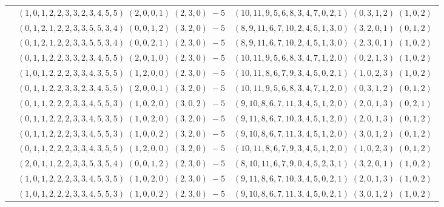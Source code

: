 \documentclass[11pt]{article}
\begin{document}
\begin{longtable}[l]{|c|c|c|}
 \cline{2-3} 
 & $(1 ,0 ,1 ,2 ,2 ,3 ,3 ,2 ,3 ,4 ,5 ,5) \;(2 ,0 ,0 ,1) \;(2 ,3 ,0) \;-5$ & $(10 ,11 ,9 ,5 ,6 ,8 ,3 ,4 ,7 ,0 ,2 ,1) \;(0 ,3 ,1 ,2) \;(1 ,0 ,2) \;$\\ 
 \cline{2-3} 
 & $(0 ,1 ,2 ,1 ,2 ,2 ,3 ,3 ,5 ,5 ,3 ,4) \;(0 ,0 ,1 ,2) \;(3 ,2 ,0) \;-5$ & $(8 ,9 ,11 ,6 ,7 ,10 ,2 ,4 ,5 ,1 ,3 ,0) \;(3 ,2 ,0 ,1) \;(0 ,1 ,2) \;$\\ 
 \cline{2-3} 
 & $(0 ,1 ,2 ,1 ,2 ,2 ,3 ,3 ,5 ,5 ,3 ,4) \;(0 ,0 ,2 ,1) \;(2 ,3 ,0) \;-5$ & $(8 ,9 ,11 ,6 ,7 ,10 ,2 ,4 ,5 ,1 ,3 ,0) \;(2 ,3 ,0 ,1) \;(1 ,0 ,2) \;$\\ 
 \cline{2-3} 
 & $(0 ,1 ,1 ,2 ,2 ,3 ,3 ,2 ,3 ,4 ,5 ,5) \;(2 ,0 ,1 ,0) \;(2 ,3 ,0) \;-5$ & $(10 ,11 ,9 ,5 ,6 ,8 ,3 ,4 ,7 ,1 ,2 ,0) \;(0 ,2 ,1 ,3) \;(1 ,0 ,2) \;$\\ 
 \cline{2-3} 
 & $(1 ,0 ,1 ,2 ,2 ,2 ,3 ,3 ,4 ,3 ,5 ,5) \;(1 ,2 ,0 ,0) \;(2 ,3 ,0) \;-5$ & $(10 ,11 ,8 ,6 ,7 ,9 ,3 ,4 ,5 ,0 ,2 ,1) \;(1 ,0 ,2 ,3) \;(1 ,0 ,2) \;$\\ 
 \cline{2-3} 
 & $(0 ,1 ,1 ,2 ,2 ,3 ,3 ,2 ,3 ,4 ,5 ,5) \;(2 ,0 ,0 ,1) \;(3 ,2 ,0) \;-5$ & $(10 ,11 ,9 ,5 ,6 ,8 ,3 ,4 ,7 ,1 ,2 ,0) \;(0 ,3 ,1 ,2) \;(0 ,1 ,2) \;$\\ 
 \cline{2-3} 
 & $(0 ,1 ,1 ,2 ,2 ,2 ,3 ,3 ,4 ,5 ,5 ,3) \;(1 ,0 ,2 ,0) \;(3 ,0 ,2) \;-5$ & $(9 ,10 ,8 ,6 ,7 ,11 ,3 ,4 ,5 ,1 ,2 ,0) \;(2 ,0 ,1 ,3) \;(0 ,2 ,1) \;$\\ 
 \cline{2-3} 
 & $(0 ,1 ,1 ,2 ,2 ,2 ,3 ,3 ,4 ,5 ,3 ,5) \;(1 ,0 ,2 ,0) \;(3 ,2 ,0) \;-5$ & $(9 ,11 ,8 ,6 ,7 ,10 ,3 ,4 ,5 ,1 ,2 ,0) \;(2 ,0 ,1 ,3) \;(0 ,1 ,2) \;$\\ 
 \cline{2-3} 
 & $(0 ,1 ,1 ,2 ,2 ,2 ,3 ,3 ,4 ,5 ,5 ,3) \;(1 ,0 ,0 ,2) \;(3 ,2 ,0) \;-5$ & $(9 ,10 ,8 ,6 ,7 ,11 ,3 ,4 ,5 ,1 ,2 ,0) \;(3 ,0 ,1 ,2) \;(0 ,1 ,2) \;$\\ 
 \cline{2-3} 
 & $(0 ,1 ,1 ,2 ,2 ,2 ,3 ,3 ,4 ,3 ,5 ,5) \;(1 ,2 ,0 ,0) \;(3 ,2 ,0) \;-5$ & $(10 ,11 ,8 ,6 ,7 ,9 ,3 ,4 ,5 ,1 ,2 ,0) \;(1 ,0 ,2 ,3) \;(0 ,1 ,2) \;$\\ 
 \cline{2-3} 
 & $(2 ,0 ,1 ,1 ,2 ,2 ,3 ,3 ,5 ,3 ,5 ,4) \;(0 ,0 ,1 ,2) \;(2 ,3 ,0) \;-5$ & $(8 ,10 ,11 ,6 ,7 ,9 ,0 ,4 ,5 ,2 ,3 ,1) \;(3 ,2 ,0 ,1) \;(1 ,0 ,2) \;$\\ 
 \cline{2-3} 
 & $(1 ,0 ,1 ,2 ,2 ,2 ,3 ,3 ,4 ,5 ,3 ,5) \;(1 ,0 ,2 ,0) \;(2 ,3 ,0) \;-5$ & $(9 ,11 ,8 ,6 ,7 ,10 ,3 ,4 ,5 ,0 ,2 ,1) \;(2 ,0 ,1 ,3) \;(1 ,0 ,2) \;$\\ 
 \cline{2-3} 
 & $(1 ,0 ,1 ,2 ,2 ,2 ,3 ,3 ,4 ,5 ,5 ,3) \;(1 ,0 ,0 ,2) \;(2 ,3 ,0) \;-5$ & $(9 ,10 ,8 ,6 ,7 ,11 ,3 ,4 ,5 ,0 ,2 ,1) \;(3 ,0 ,1 ,2) \;(1 ,0 ,2) \;$\\ 

\end{longtable}
\end{document}
